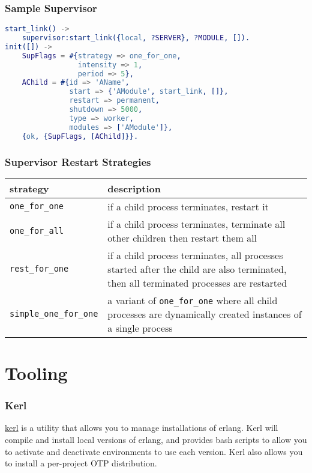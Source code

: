 \documentclass{beamer}
\begin{document}
\begin{frame}[fragile]
  \frametitle{Sample Supervisor}
\begin{lstlisting}[language=erlang]
start_link() ->
    supervisor:start_link({local, ?SERVER}, ?MODULE, []).
init([]) ->
    SupFlags = #{strategy => one_for_one,
                 intensity => 1,
                 period => 5},
    AChild = #{id => 'AName',
               start => {'AModule', start_link, []},
               restart => permanent,
               shutdown => 5000,
               type => worker,
               modules => ['AModule']},
    {ok, {SupFlags, [AChild]}}.
\end{lstlisting}
\end{frame}

\begin{frame}
  \frametitle{Supervisor Restart Strategies}
    \begin{tabular}{|l|p{2.5in}|}
      \hline
      strategy & description \\
      \hline
      {\tt one\_for\_one} & if a child process terminates, restart it \\
      \hline
      {\tt one\_for\_all} & if a child process terminates, terminate all other children then restart them all \\
      \hline
      {\tt rest\_for\_one} & if a child process terminates, all processes started after the child are also terminated, then all terminated processes are restarted \\
      \hline
      {\tt simple\_one\_for\_one} & a variant of {\tt one\_for\_one} where all child processes are dynamically created instances of a single process \\
      \hline
    \end{tabular}
\end{frame}

\section{Tooling}

\begin{frame}
  \frametitle{Kerl}
  \href{https://github.com/kerl/kerl}{kerl} is a utility that allows
  you to manage installations of erlang. Kerl will compile and install
  local versions of erlang, and provides bash scripts to allow you to
  activate and deactivate environments to use each version.  Kerl also
  allows you to install a per-project OTP distribution.
\end{frame}
\end{document}
